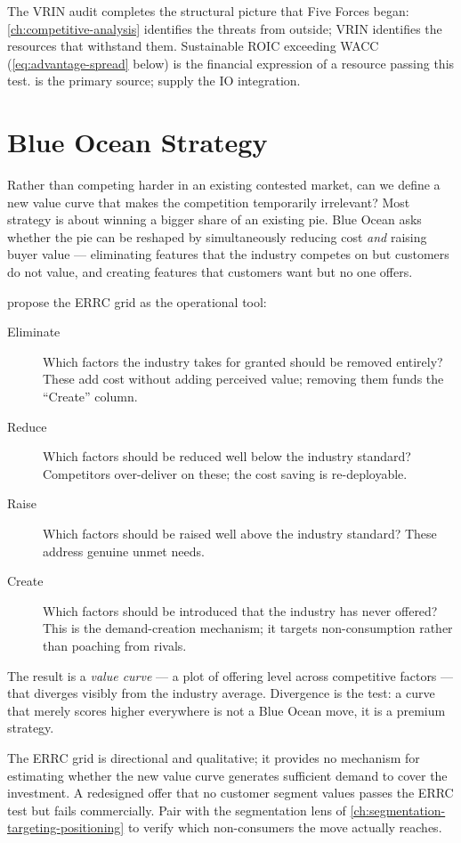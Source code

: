 The VRIN audit completes the structural picture that Five Forces began: \cref{ch:competitive-analysis}
identifies the threats from outside; VRIN identifies the resources that withstand them.
Sustainable ROIC exceeding WACC (\cref{eq:advantage-spread} below) is the financial
expression of a resource passing this test. \textcite{barney1991resource} is the
primary source; \textcite{dranove7theconomics} supply the IO integration.

\section{Blue Ocean Strategy}\label{sec:blue-ocean}

Rather than competing harder in an existing contested market, can we define a new value
curve that makes the competition temporarily irrelevant? Most strategy is about winning a
bigger share of an existing pie. Blue Ocean asks whether the pie can be reshaped by
simultaneously reducing cost \emph{and} raising buyer value --- eliminating features that
the industry competes on but customers do not value, and creating features that customers
want but no one offers.

\textcite{kim2015} propose the ERRC grid as the operational tool:
\begin{description}
  \item[Eliminate] Which factors the industry takes for granted should be removed entirely?
        These add cost without adding perceived value; removing them funds the ``Create''
        column.
  \item[Reduce] Which factors should be reduced well below the industry standard?
        Competitors over-deliver on these; the cost saving is re-deployable.
  \item[Raise] Which factors should be raised well above the industry standard?
        These address genuine unmet needs.
  \item[Create] Which factors should be introduced that the industry has never offered?
        This is the demand-creation mechanism; it targets non-consumption rather than
        poaching from rivals.
\end{description}
The result is a \emph{value curve} --- a plot of offering level across competitive factors
--- that diverges visibly from the industry average. Divergence is the test: a curve that
merely scores higher everywhere is not a Blue Ocean move, it is a premium strategy.

The ERRC grid is directional and qualitative; it provides no mechanism for estimating
whether the new value curve generates sufficient demand to cover the investment. A redesigned
offer that no customer segment values passes the ERRC test but fails commercially.
Pair with the segmentation lens of \cref{ch:segmentation-targeting-positioning} to verify
which non-consumers the move actually reaches.

